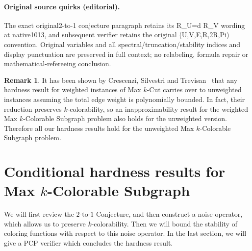 \documentclass[10pt]{article}
\theoremstyle{definition}
\newtheorem{remark}[theorem]{Remark}
\numberwithin{equation}{section}
\newcommand{\dtoone}[1]{{\sf ${#1}$-to-$1$}}
\newcommand{\maxcolor}[1]{\texorpdfstring{\textsf{Max ${#1}$-Colorable Subgraph}}{Max {#1}-Colorable Subgraph}}
\newcommand{\maxcut}[1]{{\sf Max ${#1}$-Cut}}
\begin{document}
\paragraph{Original source quirks (editorial).} The exact original2-to-1 conjecture paragraph retains its R\_U=d R\_V wording at native1013, and subsequent verifier retains the original (U,V,E,R,2R,Pi) convention. Original variables and all spectral/truncation/stability indices and display punctuation are preserved in full context; no relabeling, formula repair or mathematical-refereeing conclusion.
\clearpage
\setcounter{section}{2}\setcounter{theorem}{5}
\begin{remark}
\label{rem:wt-unwt}
  It has been shown by Crescenzi, Silvestri and Trevisan~\cite{CST01}
  that any hardness result for weighted instances of \maxcut{k}
  carries over to  unweighted instances {assuming} the
  total edge weight is polynomially bounded. In fact, their reduction
  preserves $k$-colorability, so an inapproximability result for the weighted
  \maxcolor{k} problem also holds for the unweighted version. Therefore
  all our hardness results hold for the unweighted \maxcolor{k} problem.
\end{remark}
\setcounter{section}{2}\setcounter{theorem}{0}
\section{Conditional hardness results for \maxcolor{k}}
%
We will first review the \dtoone{2} Conjecture, and then construct a
noise operator, which allows us to preserve $k$-colorability. Then we
will bound the stability of coloring functions with respect to this
noise operator. In the last section, we will give a PCP verifier which
concludes the hardness result.
%
\vspace{-1ex}
\end{document}
